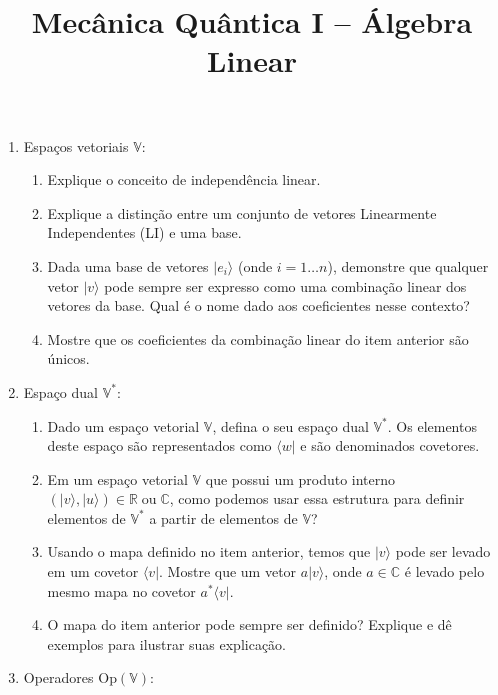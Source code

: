 \newif\ifuseseminar
\useseminartrue


\title{Mecânica Quântica I -- Álgebra Linear}	



\begin{enumerate}
	\item Espaços vetoriais $\mathbb{V}$:
	      \begin{enumerate}
		      \item Explique o conceito de independência linear.
		      \item Explique a distinção entre um conjunto de vetores Linearmente
		            Independentes (LI) e uma base.
		      \item Dada uma base de vetores $|e_i\rangle$ (onde $i=1\dots n$), demonstre
		            que qualquer vetor $|v\rangle$ pode sempre ser expresso como uma combinação
		            linear dos vetores da base. Qual é o nome dado aos coeficientes nesse
		            contexto?
		      \item Mostre que os coeficientes da combinação linear do item anterior são
		            únicos.
	      \end{enumerate}
	\item Espaço dual $\mathbb{V}^*$:
	      \begin{enumerate}
		      \item Dado um espaço vetorial $\mathbb{V}$, defina o seu espaço dual
		            $\mathbb{V}^*$. Os elementos deste espaço são representados como
		            $\langle w|$ e são denominados covetores.
		      \item Em um espaço vetorial $\mathbb{V}$ que possui um produto interno
		            $\left(|v\rangle, |u\rangle\right) \in
			            \mathbb{R}\;\text{ou}\;\mathbb{C}$, como podemos usar essa estrutura
		            para definir elementos de $\mathbb{V}^*$ a partir de elementos de
		            $\mathbb{V}$?
		      \item Usando o mapa definido no item anterior, temos que $|v\rangle$ pode
		            ser levado em um covetor $\langle v|$. Mostre que um vetor
		            $a|v\rangle$, onde $a\in\mathbb{C}$ é levado pelo mesmo mapa no
		            covetor $a^*\langle v|$.
		      \item O mapa do item anterior pode sempre ser definido? Explique e dê
		            exemplos para ilustrar suas explicação.
	      \end{enumerate}
	\item Operadores $\mathrm{Op}\left(\mathbb{V}\right)$:

\end{enumerate}
